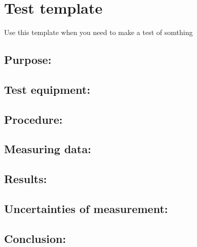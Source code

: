 \section*{Test template} %
Use this template when you need to make a test of somthing

\subsection*{Purpose:}

\subsection*{Test equipment:}

\subsection*{Procedure:}

\subsection*{Measuring data:}

\subsection*{Results:}

\subsection*{Uncertainties of measurement:}

\subsection*{Conclusion:}
